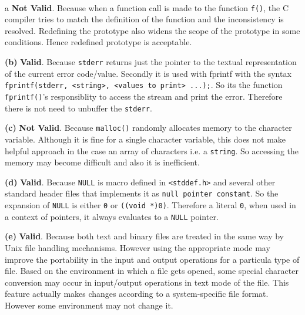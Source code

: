 \documentclass[12pt]{article}
\newcommand\question[3]{\vspace{.25in}{#1: #2}\vspace{.5em}\vspace{.10in}\\}
\renewcommand\part[1]{\vspace{.10in}\textbf{(#1)}}
\begin{document}
\question{9} {Discuss the validity of the following statements:}

\part{a} \textbf{Not Valid}. Because when a function call is made to the function \texttt{f()}, the C compiler tries to match the definition of the function and the inconsistency is resolved. Redefining the prototype also widens the scope of the prototype in some conditions. Hence redefined prototype is acceptable.

\part{b} \textbf{Valid}. Because \texttt{stderr} returns just the pointer to the textual representation of the current error code/value. Secondly it is used with fprintf with the syntax \texttt{fprintf(stderr, <string>, <values to print> ...);}. So its the function \texttt{fprintf()}'s responsiblity to access the stream and print the error. Therefore there is not need to unbuffer the \texttt{stderr}. 

\part{c} \textbf{Not Valid}. Because \texttt{malloc()} randomly allocates memory to the character variable. Although it is fine for a single character variable, this does not make helpful approach in the case an array of characters i.e. a \texttt{string}. So accessing the memory may become difficult and also it is inefficient.

\part{d} \textbf{Valid}. Because \texttt{NULL} is macro defined in \texttt{<stddef.h>} and several other standard header files that implements it as \texttt{null pointer constant}. So the expansion of \texttt{NULL} is either \texttt{0} or \texttt{((void *)0)}. Therefore a literal \texttt{0}, when used in a context of pointers, it always evaluates to a \texttt{NULL} pointer.

\part{e} \textbf{Valid}. Because both text and binary files are treated in the same way by Unix file handling mechanisms. However using the appropriate mode may improve the portability in the input and output operations for a particula type of file. Based on the environment in which a file gets opened, some special character conversion may occur in input/output operations in text mode of the file. This feature actually makes changes according to a system-specific file format. However some environment may not change it.
\end{document}
